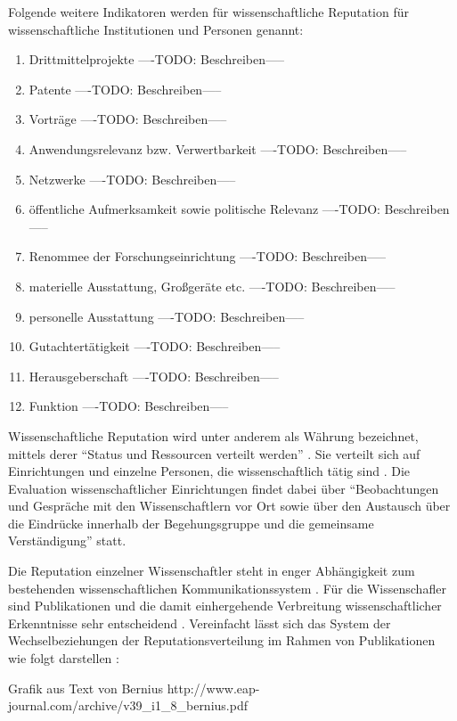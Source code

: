 Folgende weitere Indikatoren werden für wissenschaftliche Reputation für wissenschaftliche Institutionen und Personen genannt\cite{hanekop_2008}:
\begin{enumerate}
\item Drittmittelprojekte
----TODO: Beschreiben-----
\item Patente
----TODO: Beschreiben-----
\item Vorträge
----TODO: Beschreiben-----
\item Anwendungsrelevanz bzw. Verwertbarkeit
----TODO: Beschreiben-----
\item Netzwerke
----TODO: Beschreiben-----
\item öffentliche Aufmerksamkeit sowie politische Relevanz 
----TODO: Beschreiben-----
\item Renommee der Forschungseinrichtung
----TODO: Beschreiben-----
\item materielle Ausstattung, Großgeräte etc.
----TODO: Beschreiben-----
\item personelle Ausstattung
----TODO: Beschreiben-----
\item Gutachtertätigkeit
----TODO: Beschreiben-----
\item Herausgeberschaft
----TODO: Beschreiben-----
\item Funktion
----TODO: Beschreiben-----
\end{enumerate}

Wissenschaftliche Reputation wird unter anderem als Währung bezeichnet, mittels derer “Status und Ressourcen verteilt werden” \cite{hanekop_2006}. Sie verteilt sich auf Einrichtungen und einzelne Personen, die wissenschaftlich tätig sind \cite{suchen}. Die Evaluation wissenschaftlicher Einrichtungen findet dabei über “Beobachtungen und Gespräche mit den Wissenschaftlern vor Ort sowie über den Austausch über die Eindrücke innerhalb der Begehungsgruppe und die gemeinsame Verständigung”\cite{Barl_sius_2008} statt.

Die Reputation einzelner Wissenschaftler steht in enger Abhängigkeit zum bestehenden wissenschaftlichen Kommunikationssystem \cite{suchen}. Für die Wissenschafler sind Publikationen und die damit einhergehende Verbreitung wissenschaftlicher Erkenntnisse sehr entscheidend \cite{Hess_2006}. Vereinfacht lässt sich das System der Wechselbeziehungen der Reputationsverteilung im Rahmen von Publikationen wie folgt darstellen \cite{cite:21a}: 

Grafik aus Text von Bernius
http://www.eap-journal.com/archive/v39_i1_8_bernius.pdf

